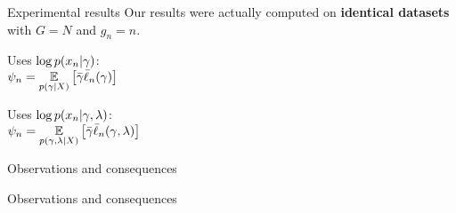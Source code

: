 \begin{frame}{Experimental results}
    Our results were actually computed on \textbf{identical datasets}
    with $G = N$ and $g_n=n$.

    \begin{center}
    \begin{minipage}{0.34\textwidth}
        Uses $\log p(x_n \vert \gamma)$:\\
        $\psi_n = \underset{p(\gamma \vert X)}{\mathbb{E}}\left[\bar{\gamma} \bar{\ell}_n(\gamma)\right]$

    \end{minipage}
    \begin{minipage}{0.65\textwidth}
        \LowDimAccuracyGraph{}
    \end{minipage}

    \begin{minipage}{0.34\textwidth}
        Uses $\log p(x_n \vert \gamma, \lambda)$:\\
        $\psi_n = \underset{p(\gamma,\lambda \vert X)}{\mathbb{E}}\left[\bar{\gamma} \bar{\ell}_n(\gamma, \lambda)\right]$



    \end{minipage}
    \begin{minipage}{0.65\textwidth}
        \HighDimAccuracyGraph{}
    \end{minipage}
\end{center}
\end{frame}




\begin{frame}{Observations and consequences}
    \ManyPlotsOne{}
\end{frame}

\begin{frame}{Observations and consequences}
    \ManyPlotsTwo{}
\end{frame}

